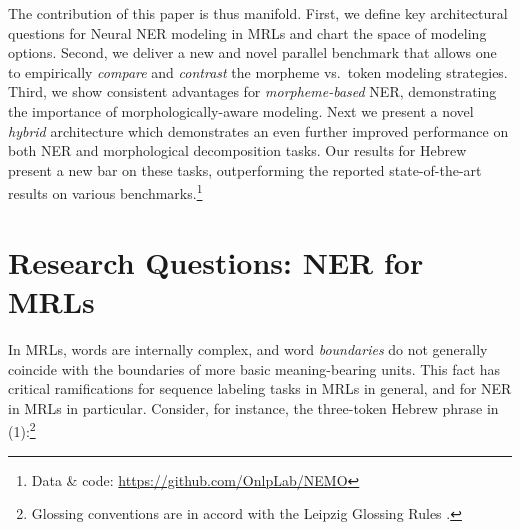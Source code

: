 \documentclass[11pt,a4paper]{article}
\begin{document}
The contribution of this paper is thus manifold. First, we define  key architectural questions for Neural NER modeling in MRLs and chart the space of modeling options.  Second, we deliver a new and novel parallel benchmark that allows one to {empirically} {\em compare} and {\em contrast} the morpheme vs.\ token modeling strategies. Third, we show consistent advantages for {\em morpheme-based} NER, demonstrating the importance of morphologically-aware modeling. Next we present  a novel {\em hybrid} architecture 
which demonstrates an even further improved performance on both NER and morphological decomposition tasks.
Our results for Hebrew present a new bar on these tasks, outperforming the reported state-of-the-art results on various benchmarks.\footnote{Data \& code: \scriptsize{\url{https://github.com/OnlpLab/NEMO}}}



\section{Research Questions: NER for MRLs}
\label{sec:research-questions}

In MRLs, words are internally complex, and word {\em boundaries} do not generally coincide with the boundaries of more basic  meaning-bearing units. This fact has critical ramifications for sequence labeling tasks in MRLs in general, and for NER in MRLs in particular.
Consider, for instance, the three-token Hebrew phrase in (1):\footnote{Glossing conventions are in accord with the Leipzig Glossing Rules \cite{comrie2008leipzig}.}
\end{document}
